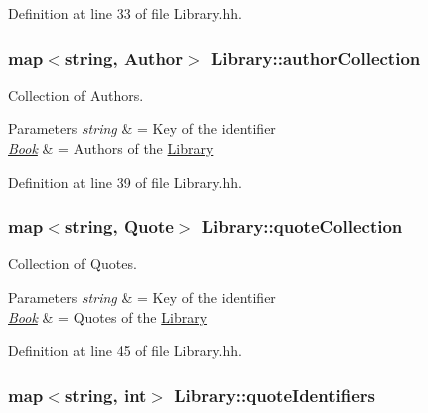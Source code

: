 Definition at line 33 of file Library.\-hh.

\hypertarget{class_library_a7a6958a0dc85a1c816ca35727306cd62}{
\subsubsection[{author\-Collection}]{\setlength{\rightskip}{0pt plus 5cm}map$<$string, {\bf Author}$>$ Library\-::author\-Collection\hspace{0.3cm}{\ttfamily [private]}}}\label{class_library_a7a6958a0dc85a1c816ca35727306cd62}


Collection of Authors. 


\begin{DoxyParams}{Parameters}
{\em string} & = Key of the identifier \\
\hline
{\em \hyperlink{class_book}{Book}} & = Authors of the \hyperlink{class_library}{Library} \\
\hline
\end{DoxyParams}


Definition at line 39 of file Library.\-hh.

\hypertarget{class_library_a84be5207332f4b2456af95907d0a43b5}{
\subsubsection[{quote\-Collection}]{\setlength{\rightskip}{0pt plus 5cm}map$<$string, {\bf Quote}$>$ Library\-::quote\-Collection\hspace{0.3cm}{\ttfamily [private]}}}\label{class_library_a84be5207332f4b2456af95907d0a43b5}


Collection of Quotes. 


\begin{DoxyParams}{Parameters}
{\em string} & = Key of the identifier \\
\hline
{\em \hyperlink{class_book}{Book}} & = Quotes of the \hyperlink{class_library}{Library} \\
\hline
\end{DoxyParams}


Definition at line 45 of file Library.\-hh.

\hypertarget{class_library_a58c1f12a0278872cd0299e586551bb7a}{
\subsubsection[{quote\-Identifiers}]{\setlength{\rightskip}{0pt plus 5cm}map$<$string, int$>$ Library\-::quote\-Identifiers\hspace{0.3cm}{\ttfamily [private]}}}\label{class_library_a58c1f12a0278872cd0299e586551bb7a}


